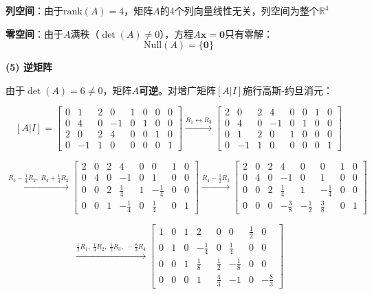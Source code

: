 \documentclass[12pt,a4paper]{article}
\begin{document}
	\textbf{列空间}：由于$\text{rank}(A) = 4$，矩阵$A$的4个列向量线性无关，列空间为整个$\mathbb{R}^4$

	
	\textbf{零空间}：由于$A$满秩（$\det(A) \neq 0$），方程$A\mathbf{x} = \mathbf{0}$只有零解：$$\text{Null}(A) = \{\mathbf{0}\}$$
	
	\textbf{(5) 逆矩阵}
	
	由于$\det(A) = 6 \neq 0$，矩阵$A$\textbf{可逆}。对增广矩阵$[A|I]$施行高斯-约旦消元：
	
	$$[A|I] = \left[\begin{array}{cccc|cccc}
	0&1&2&0 & 1&0&0&0\\
	0&4&0&-1 & 0&1&0&0\\
	2&0&2&4 & 0&0&1&0\\
	0&-1&1&0 & 0&0&0&1
	\end{array}\right]
	\xrightarrow{R_1\leftrightarrow R_3}
	\left[\begin{array}{cccc|cccc}
	2&0&2&4 & 0&0&1&0\\
	0&4&0&-1 & 0&1&0&0\\
	0&1&2&0 & 1&0&0&0\\
	0&-1&1&0 & 0&0&0&1
	\end{array}\right]$$
	
	$$\xrightarrow{R_3-\frac{1}{4}R_2,\;R_4+\frac{1}{4}R_2}
	\left[\begin{array}{cccc|cccc}
	2&0&2&4 & 0&0&1&0\\
	0&4&0&-1 & 0&1&0&0\\
	0&0&2&\frac{1}{4} & 1&-\frac{1}{4}&0&0\\
	0&0&1&-\frac{1}{4} & 0&\frac{1}{4}&0&1
	\end{array}\right]
	\xrightarrow{R_4-\frac{1}{2}R_3}
	\left[\begin{array}{cccc|cccc}
	2&0&2&4 & 0&0&1&0\\
	0&4&0&-1 & 0&1&0&0\\
	0&0&2&\frac{1}{4} & 1&-\frac{1}{4}&0&0\\
	0&0&0&-\frac{3}{8} & -\frac{1}{2}&\frac{3}{8}&0&1
	\end{array}\right]$$
	
	$$\xrightarrow{\frac{1}{2}R_1,\;\frac{1}{4}R_2,\;\frac{1}{2}R_3,\;-\frac{8}{3}R_4}
	\left[\begin{array}{cccc|cccc}
	1&0&1&2 & 0&0&\frac{1}{2}&0\\
	0&1&0&-\frac{1}{4} & 0&\frac{1}{4}&0&0\\
	0&0&1&\frac{1}{8} & \frac{1}{2}&-\frac{1}{8}&0&0\\
	0&0&0&1 & \frac{4}{3}&-1&0&-\frac{8}{3}
	\end{array}\right]$$
	
\end{document}
